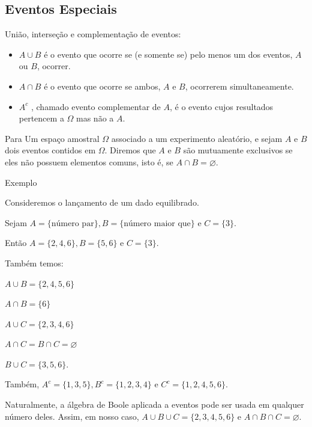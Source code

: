 \documentclass[t]{beamer}
\begin{document}
\subsection{Eventos Especiais}
\begin{frame}

União, interseção e complementação de eventos:

\begin{itemize}
	\item $A  \cup B$ é o evento que ocorre se (e somente se) pelo menos um dos eventos, $A$ ou $B$, ocorrer.
	\item $A \cap B$ é o evento que ocorre se ambos, $A$ e $B$, ocorrerem simultaneamente.
	\item $A^c$ , chamado evento complementar de $A$, é o evento cujos resultados pertencem a $\Omega$ mas não a $A$.
\end{itemize}

\begin{exampleblock}{Para}
	Um espaço amostral $\Omega$ associado a um experimento aleatório, e sejam $A$ e $B$ dois eventos
	contidos em $\Omega$. Diremos que $A$ e $B$ são mutuamente exclusivos se eles não possuem elementos comuns,
	isto é, se $A \cap B = \varnothing$.
\end{exampleblock}

\end{frame}
\begin{frame}

\begin{exampleblock}{Exemplo}

	Consideremos o lançamento de um dado equilibrado.
	
	Sejam $A= \{\text{número par}\} , B = \{\text{número maior que}\} \text{ e } C =\{ 3 \}$.
	
	Então $A =\{ 2,4,6 \} , B = \{ 5,6 \} \text{ e } C = \{ 3 \}$.

	Também temos:

	$A \cup B =\{ 2,4,5,6 \}$
	
	$A \cap B= \{ 6 \}$
	
	$A \cup C = \{ 2,3,4,6 \}$
	
	$A \cap C = B \cap C = \varnothing$
	
	$B \cup C = \{ 3,5,6 \}$.


	Também, $A^c = \{ 1,3,5\} , B^c = \{ 1,2,3,4 \} \text{ e } C^c = \{ 1,2,4,5,6\}$.

	Naturalmente, a álgebra de Boole aplicada a eventos pode ser usada em qualquer número deles. Assim,
em nosso caso, $A \cup B \cup C = \{2,3,4,5,6\} \text{ e } A \cap B \cap C = \varnothing$.
	
\end{exampleblock}

\end{frame}
\end{document}
